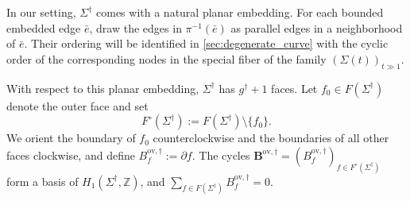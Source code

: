 \documentclass[12pt]{amsart}
\numberwithin{equation}{section}
\theoremstyle{definition}
\newcommand{\Z}{\mathbb{Z}}
\def\trop{\dagger}
\def\mcurve{\Sigma}
\def\tropmcurve{\mcurve^\trop}
\begin{document}
In our setting, $\tropmcurve$ comes with a natural planar embedding. For each bounded embedded edge
$\bar e$, draw the edges in $\pi^{-1}(\bar e)$ as parallel edges
in a neighborhood of $\bar e$. Their ordering will be identified in
\cref{sec:degenerate_curve} with the cyclic order of the corresponding
nodes in the special fiber of the family $(\mcurve(t))_{t \gg 1}$.

With respect to this planar embedding, $\tropmcurve$ has
$g^\trop+1$ faces. Let
$
f_0\in F(\tropmcurve)
$
denote the outer face and set
\[
F^\circ(\tropmcurve)
:=
F(\tropmcurve)\setminus\{f_0\}.
\]
We orient the boundary of $f_0$ counterclockwise and the boundaries of
all other faces clockwise, and define
$
B_f^{\mathrm{ov},\trop}
:=
\partial f.
$
The cycles
$
\bm B^{\mathrm{ov},\trop}
=
(
B_f^{\mathrm{ov},\trop}
)_{f\in F^\circ(\tropmcurve)}
$
form a basis of $H_1(\tropmcurve,\Z)$, and
$
\sum_{f\in F(\tropmcurve)}
B_f^{\mathrm{ov},\trop}
=
0.
$
\end{document}
